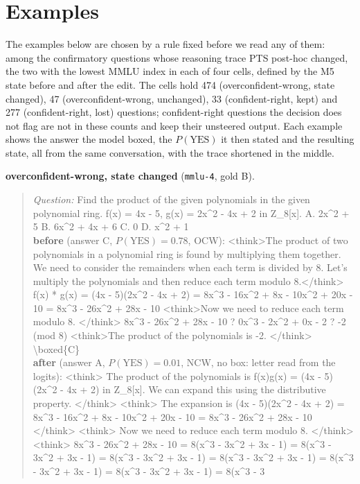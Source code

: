 \section{Examples}
\label{app:examples}

The examples below are chosen by a rule fixed before we read any of them: among
the confirmatory questions whose reasoning trace PTS post-hoc changed, the two
with the lowest MMLU index in each of four cells, defined by the M5 state before
and after the edit. The cells hold 474 (overconfident-wrong, state changed), 47
(overconfident-wrong, unchanged), 33 (confident-right, kept) and 277
(confident-right, lost) questions; confident-right questions the decision does
not flag are not in these counts and keep their unsteered output. Each example
shows the answer the model boxed, the $P(\mathrm{YES})$ it then stated and the
resulting state, all from the same conversation, with the trace shortened in
the middle.

\noindent\textbf{overconfident-wrong, state changed} (\texttt{mmlu-4}, gold B).
\begin{quote}\scriptsize\emph{Question:} Find the product of the given polynomials in the given polynomial ring. f(x) = 4x - 5, g(x) = 2x\^{}2 - 4x + 2 in Z\_8[x]. A. 2x\^{}2 + 5 B. 6x\^{}2 + 4x + 6 C. 0 D. x\^{}2 + 1\\[2pt]
\textbf{before} (answer C, $P(\mathrm{YES})=0.78$, OCW): {\ttfamily \textless{}think\textgreater{}The product of two polynomials in a polynomial ring is found by multiplying them together. We need to consider the remainders when each term is divided by 8. Let's multiply the polynomials and then reduce each term modulo 8.\textless{}/think\textgreater{} f(x) * g(x) = (4x - 5)(2x\^{}2 - 4x + 2) = 8x\^{}3 - 16x\^{}2 + 8x - 10x\^{}2 + 20x - 10 = 8x\^{}3 - 26x\^{}2 + 28x - 10 \textless{}think\textgreater{}Now we need to reduce each term modulo 8. \textless{}/think\textgreater{} 8x\^{}3 - 26x\^{}2 + 28x - 10 ? 0x\^{}3 - 2x\^{}2 + 0x - 2 ? -2 (mod 8) \textless{}think\textgreater{}The product of the polynomials is -2. \textless{}/think\textgreater{} \textbackslash{}boxed\{C\}}\\[2pt]
\textbf{after} (answer A, $P(\mathrm{YES})=0.01$, NCW, no box: letter read from the logits): {\ttfamily \textless{}think\textgreater{} The product of the polynomials is f(x)g(x) = (4x - 5)(2x\^{}2 - 4x + 2) in Z\_8[x]. We can expand this using the distributive property. \textless{}/think\textgreater{} \textless{}think\textgreater{} The expansion is (4x - 5)(2x\^{}2 - 4x + 2) = 8x\^{}3 - 16x\^{}2 + 8x - 10x\^{}2 + 20x - 10 = 8x\^{}3 - 26x\^{}2 + 28x - 10 \textless{}/think\textgreater{} \textless{}think\textgreater{} Now we need to reduce each term modulo 8. \textless{}/think\textgreater{} \textless{}think\textgreater{} 8x\^{}3 - 26x\^{}2 + 28x - 10 = 8(x\^{}3 - 3x\^{}2 + 3x - 1) = 8(x\^{}3 - 3x\^{}2 + 3x - 1) = 8(x\^{}3 - 3x\^{}2 + 3x - 1) = 8(x\^{}3 - 3x\^{}2 + 3x - 1) = 8(x\^{}3 - 3x\^{}2 + 3x - 1) = 8(x\^{}3 - 3x\^{}2 + 3x - 1) = 8(x\^{}3 - 3}
\end{quote}

